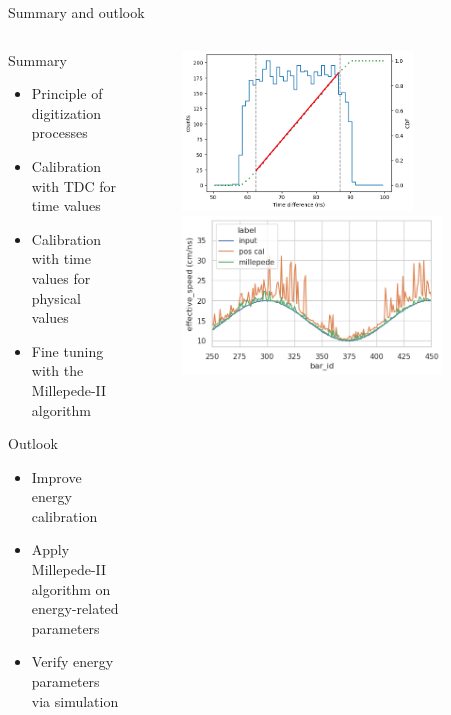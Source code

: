 \documentclass{ikpKoeln}
\begin{document}
\begin{frame}[t]{Summary and outlook}
	\vspace{-1em}
	\begin{columns}[c]
		\begin{column}{0.45 \textwidth}
			\begin{block} {Summary}
				\begin{itemize}
					\setlength\itemsep{0.5em}
					\item Principle of digitization processes
					\item Calibration with TDC for time values
					\item Calibration with time values for physical values
					\item Fine tuning with the Millepede-II algorithm
				\end{itemize}
			\end{block}
			\begin{exampleblock} {Outlook}
				\begin{itemize}
					\setlength\itemsep{0.5em}
					\item Improve energy calibration
					\item Apply Millepede-II algorithm on energy-related parameters
					\item Verify energy parameters via simulation
				\end{itemize}
			\end{exampleblock}
		\end{column}
		\begin{column}{0.45 \textwidth}
			\begin{figure}
				\includegraphics[width = 0.8\textwidth]{neuland/position_cal/TimeDifference4.png}
				\includegraphics[width = 0.9\textwidth]{neuland/millepede/sim_eff_c.png}

\end{figure}
\end{column}
\end{columns}
\end{frame}
\end{document}
